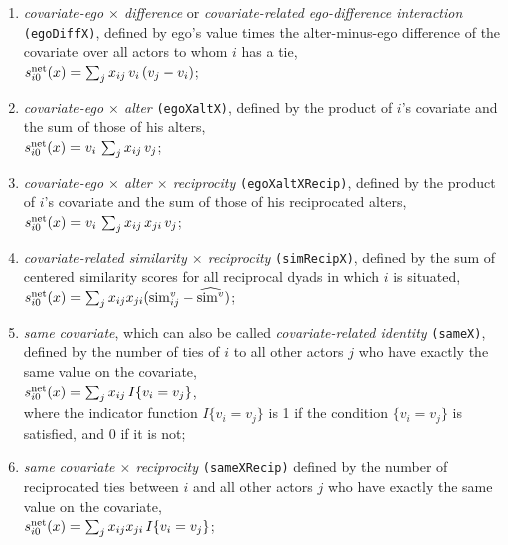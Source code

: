 \documentclass[a4paper,fleqn,11pt]{article}
\newcommand{\+}{\, + \,}
\newcommand{\vit}{\theenumi}
\begin{document}
\begin{enumerate}
 \item {\em covariate-ego $\times$ difference} or {\em covariate-related ego-difference interaction}
 \texttt{(egoDiffX)},
 defined by ego's value times the alter-minus-ego difference of the covariate over all actors
 to whom $i$ has a tie,\\
 $s^{\rm net}_{i\vit}(x) = \sum_j x_{ij}\, v_i \, (v_j - v_i)$;


 \item {\em covariate-ego $\times$ alter} \texttt{(egoXaltX)},
 defined by the product of $i$'s covariate and the sum of those of his alters,\\
 $s^{\rm net}_{i\vit}(x) = v_i \, \sum_j x_{ij}\, v_j $;

 \item {\em covariate-ego $\times$ alter $\times$ reciprocity}
 \texttt{(egoXaltXRecip)},
 defined by the product of $i$'s covariate and the sum of those
 of his reciprocated alters,\\
 $s^{\rm net}_{i\vit}(x) = v_i \, \sum_j x_{ij}\,x_{ji}\, v_j $;

 \item {\em covariate-related similarity $\times$ reciprocity}
 \texttt{(simRecipX)}, defined by
 the sum of centered similarity scores for all
 reciprocal dyads in which $i$ is situated,\\
 $s^{\rm net}_{i\vit}(x) = \sum_j x_{ij}x_{ji} ({\rm sim}^v_{ij} - \widehat{{\rm sim}^v}) $;

 \item \emph{same covariate}, which can also be called {\em covariate-related identity} \texttt{(sameX)},
 defined by the
 number of ties of $i$ to all other actors $j$ who have
 exactly the same value on the covariate,\\
 $s^{\rm net}_{i\vit}(x) = \sum_j x_{ij}\, I\{v_i = v_j \} $,\\
 where the indicator function $I\{v_i = v_j \} $ is 1 if the condition $\{v_i = v_j \} $
 is satisfied, and 0 if it is not;\\

 \item {\em same covariate $\times$ reciprocity}
\texttt{(sameXRecip)} defined by the
 number of reciprocated ties between $i$ and all other actors $j$ who have
 exactly the same value on the covariate,\\
 $s^{\rm net}_{i\vit}(x) = \sum_j x_{ij} x_{ji}\, I\{v_i = v_j \} $;


\end{enumerate}
\end{document}
